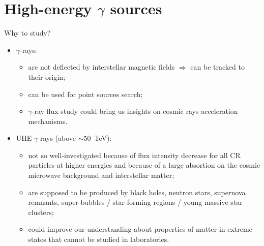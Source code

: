 
\begin{frame}
\titlepage
\end{frame}

\section{High-energy \texorpdfstring{$\gamma$}{gamma} sources}

\begin{frame}{Why to study?}
  \begin{itemize}
    \item $\gamma$-rays:
    \begin{itemize}
        \item are not deflected by interstellar magnetic fields $\Rightarrow$ can be tracked to their origin;
        \item can be used for point sources search;
        \item $\gamma$-ray flux study could bring us insights on cosmic rays acceleration mechanisms.
    \end{itemize}
    \item UHE $\gamma$-rays (above $\sim50$~TeV):
    \begin{itemize}
        \item not so well-investigated because of flux intensity decrease for all CR particles at higher energies and because of a large absortion on the cosmic microwave background and interstellar matter;
        \item are supposed to be produced by black holes, neutron stars, supernova remnants, super-bubbles / star-forming regions / young massive star clusters;
        \item could improve our understanding about properties of matter in extreme states that cannot be studied in laboratories.
    \end{itemize}
  \end{itemize}
\end{frame}
